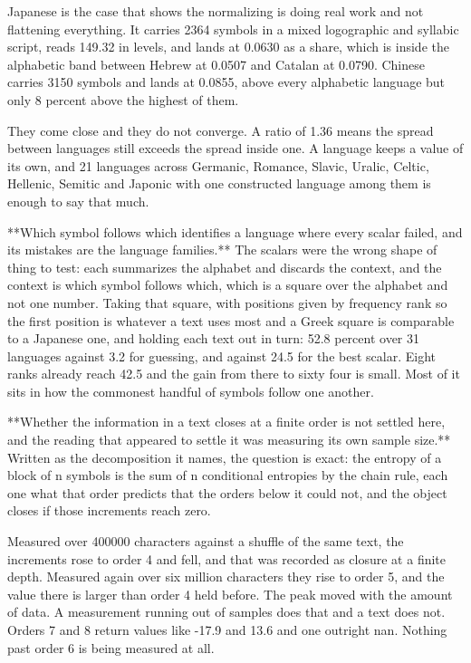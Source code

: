 Japanese is the case that shows the normalizing is doing real work and not flattening everything. It carries 2364 symbols in a mixed logographic and syllabic script, reads 149.32 in levels, and lands at 0.0630 as a share, which is inside the alphabetic band between Hebrew at 0.0507 and Catalan at 0.0790. Chinese carries 3150 symbols and lands at 0.0855, above every alphabetic language but only 8 percent above the highest of them.

They come close and they do not converge. A ratio of 1.36 means the spread between languages still exceeds the spread inside one. A language keeps a value of its own, and 21 languages across Germanic, Romance, Slavic, Uralic, Celtic, Hellenic, Semitic and Japonic with one constructed language among them is enough to say that much.

**Which symbol follows which identifies a language where every scalar failed, and its mistakes are the language families.** The scalars were the wrong shape of thing to test: each summarizes the alphabet and discards the context, and the context is which symbol follows which, which is a square over the alphabet and not one number. Taking that square, with positions given by frequency rank so the first position is whatever a text uses most and a Greek square is comparable to a Japanese one, and holding each text out in turn: 52.8 percent over 31 languages against 3.2 for guessing, and against 24.5 for the best scalar. Eight ranks already reach 42.5 and the gain from there to sixty four is small. Most of it sits in how the commonest handful of symbols follow one another.

**Whether the information in a text closes at a finite order is not settled here, and the reading that appeared to settle it was measuring its own sample size.** Written as the decomposition it names, the question is exact: the entropy of a block of n symbols is the sum of n conditional entropies by the chain rule, each one what that order predicts that the orders below it could not, and the object closes if those increments reach zero.

Measured over 400000 characters against a shuffle of the same text, the increments rose to order 4 and fell, and that was recorded as closure at a finite depth. Measured again over six million characters they rise to order 5, and the value there is larger than order 4 held before. The peak moved with the amount of data. A measurement running out of samples does that and a text does not. Orders 7 and 8 return values like -17.9 and 13.6 and one outright nan. Nothing past order 6 is being measured at all.

